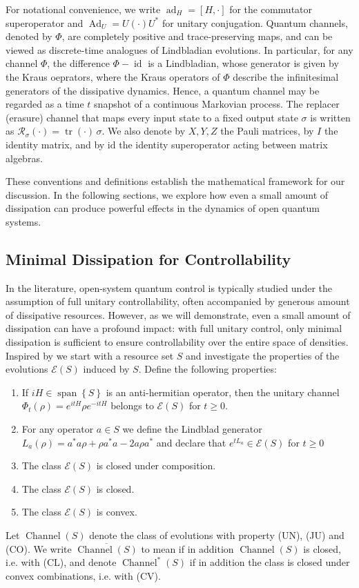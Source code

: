 \documentclass[11pt,reqno]{amsart}
\theoremstyle{definition}
\newcommand{\mc}{\mathcal}
\newcommand{\lset}{\left\{ }
\newcommand{\rset}{\right\} }
\DeclareMathOperator{\tr}{tr}
\DeclareMathOperator{\id}{id}
\DeclareMathOperator{\spn}{span}
\DeclareMathOperator{\ad}{ad}
\DeclareMathOperator{\Ad}{Ad}
\DeclareMathOperator{\chan}{Channel}
\begin{document}
For notational convenience, we write $\ad_H = [H, \cdot]$ for the commutator superoperator and $\Ad_U = U(\cdot)U^*$ for unitary conjugation. Quantum channels, denoted by $\Phi$, are completely positive and trace-preserving maps, and can be viewed as discrete-time analogues of Lindbladian evolutions. In particular, for any channel $\Phi$, the difference $\Phi - \id$ is a Lindbladian, whose generator is given by the Kraus oeprators, where the Kraus operators of $\Phi$ describe the infinitesimal generators of the dissipative dynamics. Hence, a quantum channel may be regarded as a time $t$ snapshot of a continuous Markovian process. The replacer (erasure) channel that maps every input state to a fixed output state $\sigma$ is written as $\mc R_\sigma(\cdot) = \tr(\cdot)\,\sigma$. We also denote by $X, Y, Z$ the Pauli matrices, by $I$ the identity matrix, and by $\mathrm{id}$ the identity superoperator acting between matrix algebras.

These conventions and definitions establish the mathematical framework for our discussion. In the following sections, we explore how even a small amount of dissipation can produce powerful effects in the dynamics of open quantum systems.


\subsection{Minimal Dissipation for Controllability}
In the literature, open-system quantum control is typically studied under the assumption of full unitary controllability, often accompanied by generous amount of dissipative resources. However, as we will demonstrate, even a small amount of dissipation can have a profound impact: with full unitary control, only minimal dissipation is sufficient to ensure controllability over the entire space of densities.
Inspired by \cite{lip_complexity, lip_simulation} we start with a resource set $S$ and investigate the properties of the evolutions $\mc E(S)$ induced by $S$. Define the following properties: 
\begin{enumerate}
    \item[(UN)] If $iH\in \spn\lset S\rset$ is an anti-hermitian operator, then the unitary channel $\Phi_t(\rho)=e^{itH}\rho e^{-itH}$ belongs to $\mc E(S)$ for $t \geq 0$. 
    \item[(JU)] For any operator $a\in S$ we define the Lindblad generator $L_a(\rho)=a^*a\rho+\rho a^*a-2a\rho a^*$ and declare that $ e^{tL_a}\in \mc E(S)$ for $t \geq 0$
    \item[(CO)] The class $\mc E(S)$ is closed under composition.
    \item[(CL)] The class $\mc E(S)$ is closed.
    \item[(CV)] The class $\mc E(S)$ is convex.
\end{enumerate}
Let $\chan(S)$ denote the class of evolutions with property (UN), (JU) and (CO). We write $\overline{\chan(S)}$ to mean if in addition $\chan(S)$ is closed, i.e. with (CL), and denote $\chan^*(S)$ if in addition the class is closed under convex combinations, i.e. with (CV).
\end{document}
